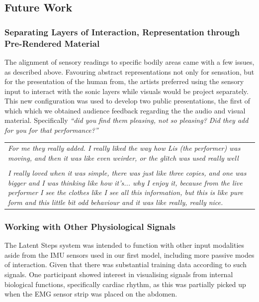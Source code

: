 \subsection{Future Work}

\subsubsection{Separating Layers of Interaction, Representation through Pre-Rendered Material}

The alignment of sensory readings to specific bodily areas came with a few issues, as described above. Favouring abstract representations not only for sensation, but for the presentation of the human from, the artists preferred using the sensory input to interact with the sonic layers while visuals would be project separately. This new configuration was used to develop two public presentations, the first of which which we obtained audience feedback regarding the the audio and visual material. Specifically \textit{``did you find them pleasing, not so pleasing? Did they add for you for that performance?''}

\begin{center}
\begin{tabular}{ p{13cm}}
\textit{For me they really added. I really liked the way how Lis (the performer) was moving, and then it was like even weirder, or the glitch was used really well} \\
\\
\textit{I really loved when it was simple, there was just like three copies, and one was bigger and I was thinking like how it's... why I enjoy it, because from the live performer I see the clothes like I see all this information, but this is like pure form and this little bit odd behaviour and it was like really, really nice.}
\end{tabular}
\end{center}

\subsubsection{Working with Other Physiological Signals}

The Latent Steps system was intended to function with other input modalities aside from the IMU sensors used in our first model, including more passive modes of interaction. Given that there was substantial training data according to such signals. One participant showed interest in visualising signals from internal biological functions, specifically cardiac rhythm, as this was partially picked up when the EMG sensor strip was placed on the abdomen.


